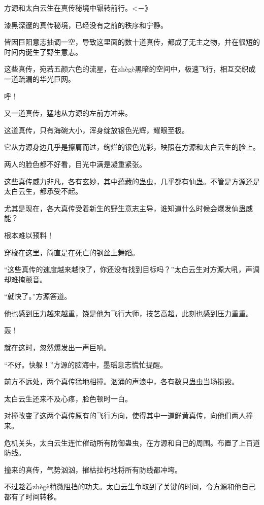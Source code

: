 
\begin{this_body}

方源和太白云生在真传秘境中辗转前行。<－》

漆黑深邃的真传秘境，已经没有之前的秩序和宁静。

皆因巨阳意志抽调一空，导致这里面的数十道真传，都成了无主之物，并在很短的时间内诞生了野生意志。

这些真传，宛若五颜六色的流星，在zhègè黑暗的空间中，极速飞行，相互交织成一道疏漏的华光巨网。

呼！

又一道真传，猛地从方源的左前方冲来。

这道真传，只有海碗大小，浑身绽放银色光辉，耀眼至极。

它从方源身边几乎是擦肩而过，绚烂的银色光彩，映照在方源和太白云生的脸上。

两人的脸色都不好看，目光中满是凝重紧张。

这些真传威力非凡，各有玄妙，其中蕴藏的蛊虫，几乎都有仙蛊。不管是方源还是太白云生，都承受不起。

尤其是现在，各大真传受着新生的野生意志主导，谁知道什么时候会爆发仙蛊威能？

根本难以预料！

穿梭在这里，简直是在死亡的钢丝上舞蹈。

“这些真传的速度越来越快了，你还没有找到目标吗？”太白云生对方源大吼，声调却难掩颤音。

“就快了。”方源答道。

他也感到压力越来越重，饶是他为飞行大师，技艺高超，此刻也感到压力重重。

轰！

就在这时，忽然爆发出一声巨响。

“不好。快躲！”方源的脑海中，墨瑶意志慌忙提醒。

前方不远处，两个真传猛地相撞。汹涌的声浪中，各有数只蛊虫当场损毁。

太白云生还来不及心疼，脸色顿时一白。

对撞改变了这两个真传原有的飞行方向，使得其中一道鲜黄真传，向他们两人撞来。

危机关头，太白云生连忙催动所有防御蛊虫，在方源和自己的周围。布置了上百道防线。

撞来的真传，气势汹汹，摧枯拉朽地将所有防线都冲垮。

不过趁着zhègè稍微阻挡的功夫。太白云生争取到了关键的时间，令方源和他自己都有了时间转移。


\end{this_body}
